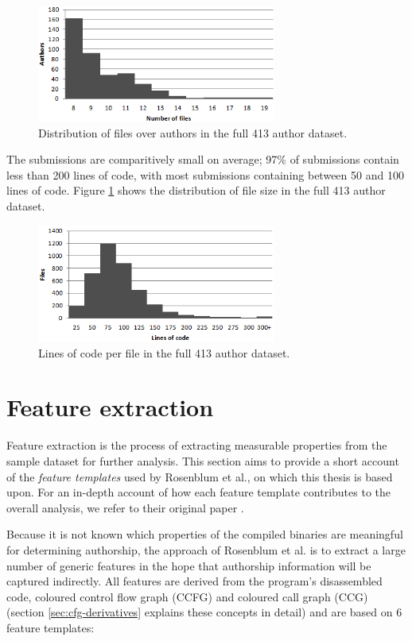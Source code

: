 \documentclass[a4paper,11pt]{kth-mag}
\begin{document}
\begin{figure}[!htb]
    \centering
    \includegraphics[width=0.7\textwidth]{loc}
    \caption{Distribution of files over authors in the full 413 author
    dataset.}
    \label{fig:loc}
\end{figure}

The submissions are comparitively small on average; 97\% of submissions contain
less than 200 lines of code, with most submissions containing between 50 and
100 lines of code. Figure \ref{fig:loc} shows the distribution of file size
in the full 413 author dataset. 

\begin{figure}[!htb]
    \centering
    \includegraphics[width=0.7\textwidth]{files}
    \caption{Lines of code per file in the full 413 author dataset.}
    \label{fig:files}
\end{figure}

\section{Feature extraction}
\label{sec:feature-extraction}
Feature extraction is the process of extracting measurable properties from the
sample dataset for further analysis. This section aims to provide a short
account of the \emph{feature templates} used by Rosenblum et al., on which this
thesis is based upon. For an in-depth account of how each feature template contributes
to the overall analysis, we refer to their original paper
\parencite{rosenblum2011wrote}.

Because it is not known which properties of the compiled binaries are
meaningful for determining authorship, the approach of Rosenblum et al. is to
extract a large number of generic features in the hope that authorship
information will be captured indirectly. All features are derived from the
program's disassembled code, coloured control flow graph (CCFG) and coloured
call graph (CCG) (section \ref{sec:cfg-derivatives} explains these concepts in
detail) and are based on 6 feature templates: 
\end{document}
